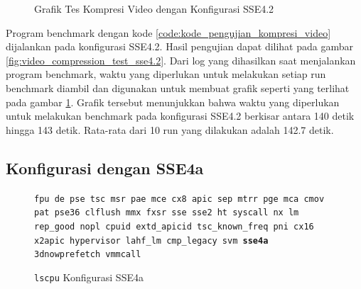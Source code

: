 \begin{figure}
    \centering
    \caption{Grafik Tes Kompresi Video dengan Konfigurasi SSE4.2}
    \label{fig:video_compression_test_sse4.2_graph}
\end{figure}

Program benchmark dengan kode \ref{code:kode_pengujian_kompresi_video} dijalankan pada konfigurasi SSE4.2. Hasil pengujian dapat dilihat pada gambar \ref{fig:video_compression_test_sse4.2}. Dari log yang dihasilkan saat menjalankan program benchmark, waktu yang diperlukan untuk melakukan setiap run benchmark diambil dan digunakan untuk membuat grafik seperti yang terlihat pada gambar \ref{fig:video_compression_test_sse4.2_graph}. Grafik tersebut menunjukkan bahwa waktu yang diperlukan untuk melakukan benchmark pada konfigurasi SSE4.2 berkisar antara 140 detik hingga 143 detik. Rata-rata dari 10 run yang dilakukan adalah 142.7 detik.

\subsection{Konfigurasi dengan SSE4a}
\begin{figure}
    \texttt{fpu de pse tsc msr pae mce cx8 apic sep mtrr pge mca cmov pat pse36 clflush mmx fxsr sse sse2 ht syscall nx lm rep\_good nopl cpuid extd\_apicid tsc\_known\_freq pni cx16 x2apic hypervisor lahf\_lm cmp\_legacy svm \textbf{sse4a} 3dnowprefetch vmmcall}
    \caption{\texttt{lscpu} Konfigurasi SSE4a}
    \label{fig:lscpu_video_compression_test_sse4a}
\end{figure}

